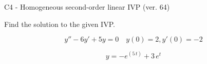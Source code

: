 \begin{exercise}
  \begin{exerciseTitle}C4 - Homogeneous second-order linear IVP (ver. 64)\end{exerciseTitle}
  \begin{exerciseStatement}
    
Find the solution to the given IVP.

    
\[y''-6y'+5y = 0 \hspace{1em} y(0) = 2 , y'(0) = -2\]

  \end{exerciseStatement}
  \begin{exerciseAnswer}
    
\[y= -e^{\left(5 \, t\right)} + 3 \, e^{t}\]

  \end{exerciseAnswer}
\end{exercise}